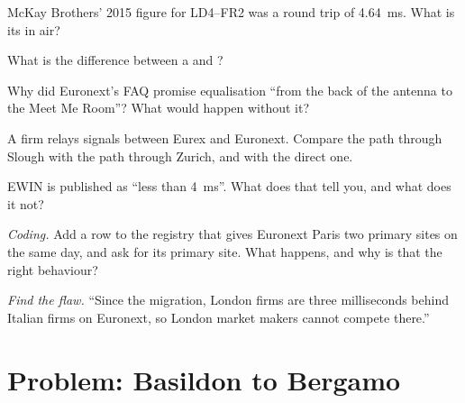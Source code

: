 \begin{exercise}[$\star$]\label{exo:nw:the-european-map:2}
McKay Brothers' 2015 figure for LD4--FR2 was a round trip of \qty{4.64}{\milli\second}. What is its  in air?
\end{exercise}

\begin{exercise}[$\star$]\label{exo:nw:the-european-map:3}
What is the difference between a  and ?
\end{exercise}

\begin{exercise}[$\star\star$]\label{exo:nw:the-european-map:4}
Why did Euronext's FAQ promise equalisation ``from the back of the antenna to the Meet Me Room''? What would happen without it?
\end{exercise}

\begin{exercise}[$\star\star$]\label{exo:nw:the-european-map:5}
A firm relays signals between Eurex and Euronext. Compare the path through Slough with the path through Zurich, and with the direct one.
\end{exercise}

\begin{exercise}[$\star\star$]\label{exo:nw:the-european-map:6}
EWIN is published as ``less than \qty{4}{\milli\second}''. What does that tell you, and what does it not?
\end{exercise}

\begin{exercise}[$\star\star\star$]\label{exo:nw:the-european-map:7}
\emph{Coding.} Add a row to the registry that gives Euronext Paris two primary sites on the same day, and ask for its primary site. What happens,
and why is that the right behaviour?
\end{exercise}

\begin{exercise}[$\star\star\star$]\label{exo:nw:the-european-map:8}
\emph{Find the flaw.} ``Since the migration, London firms are three milliseconds behind Italian firms on Euronext, so London market makers
cannot compete there.''
\end{exercise}

\section{Problem: Basildon to Bergamo}

